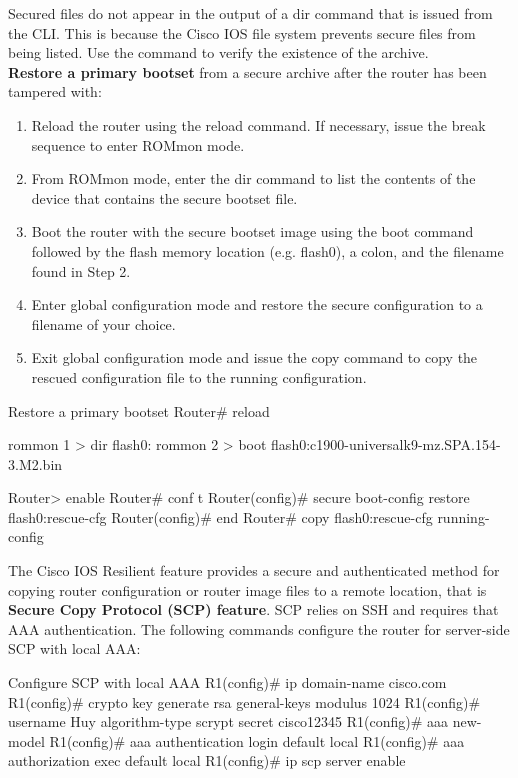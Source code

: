 Secured files do not appear in the output of a dir command that is issued from the CLI. This is because the Cisco IOS file system prevents secure files from being listed. Use the  command to verify the existence of the archive.\\

\textbf{Restore a primary bootset} from a secure archive after the router has been tampered with:

\begin{enumerate}
\item Reload the router using the reload command. If necessary, issue the break sequence to enter ROMmon mode.
\item From ROMmon mode, enter the dir command to list the contents of the device that contains the secure bootset file.
\item Boot the router with the secure bootset image using the boot command followed by the flash memory location (e.g. flash0), a colon, and the filename found in Step 2.
\item Enter global configuration mode and restore the secure configuration to a filename of your choice.
\item Exit global configuration mode and issue the copy command to copy the rescued configuration file to the running configuration.
\end{enumerate}

\begin{sexylisting}{Restore a primary bootset}
Router# reload

rommon 1 > dir flash0:
rommon 2 > boot flash0:c1900-universalk9-mz.SPA.154-3.M2.bin

Router> enable
Router# conf t
Router(config)# secure boot-config restore flash0:rescue-cfg
Router(config)# end
Router# copy flash0:rescue-cfg running-config
\end{sexylisting}

The Cisco IOS Resilient feature provides a  secure and authenticated method for copying router configuration or router image files to a remote location, that is \textbf{Secure Copy Protocol (SCP) feature}. SCP relies on SSH and requires that AAA authentication.  The following commands configure the router for server-side SCP with local AAA:

\begin{sexylisting}{Configure SCP with local AAA}
R1(config)# ip domain-name cisco.com
R1(config)# crypto key generate rsa general-keys modulus 1024
R1(config)# username Huy algorithm-type scrypt secret cisco12345
R1(config)# aaa new-model 
R1(config)# aaa authentication login default local 
R1(config)# aaa authorization exec default local
R1(config)# ip scp server enable
\end{sexylisting}

